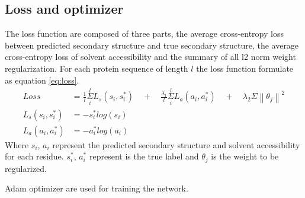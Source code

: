 \subsection{Loss and optimizer}
The loss function are composed of three parts, the average cross-entropy loss between predicted secondary structure and true secondary structure, the average cross-entropy loss of solvent accessibility and the summary of all l2 norm  weight regularization. For each protein sequence of length $l$ the loss function formulate as equation \ref{eq:loss}. 
\begin{subequations} 
    \begin{align}
    Loss &=\frac { 1 }{ l } \overset { l }{ \underset { i }{ \Sigma  }  } L_{ s }(s_{ i },s_{ i }^{ * })\quad +\quad \frac { \lambda_1 }{ l } \overset { l }{ \underset { i }{ \Sigma  }  } L_{ a }(a_{ i },a_{ i }^{ * }) \quad +\quad \lambda_2\Sigma\left\| \theta_j \right\|^2 \label{eq:loss}\\
    L_s(s_i, s_i^*) &= -s_i^*log(s_i)\\
    L_a(a_i, a_i^*) &= -a_i^*log(a_i)
    \end{align}	
\end{subequations}
Where $s_i$, $a_i$ represent the predicted secondary structure and solvent accessibility for each residue. $s_i^*$, $a_i^*$ represent is the true label and $\theta_j$ is the weight to be regularized. \par
Adam optimizer \cite{kingma2014adam} are used for training the network.





